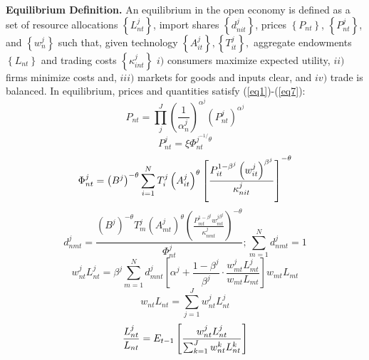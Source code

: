 \documentclass{article}
\begin{document}
\textbf{Equilibrium Definition. } An equilibrium in the open economy is
defined as a set of resource allocations $\left\{ L_{nt}^{j}\right\} $,
import shares $\left\{ d_{nit}^{j}\right\} $, prices $\left\{ P_{nt}\right\} 
$, $\left\{ P_{nt}^{j}\right\} $, and $\left\{ w_{n}^{j}\right\} $ such
that, given technology $\left\{ A_{it}^{j}\right\}
,\left\{T_{it}^{j}\right\} ,$ aggregate endowments $\left\{ L_{nt}\right\} $
and trading costs $\left\{ \kappa _{int}^{j}\right\} $ $i)$ consumers
maximize expected utility, $ii)$ firms minimize costs and, $iii)$ markets
for goods and inputs clear, and $iv)$ trade is balanced. In equilibrium,
prices and quantities satisfy (\ref{eq1})-(\ref{eq7}): 
\begin{equation}
P_{nt}=\prod_{j}^{J}\left( \frac{1}{\alpha _{n}^{j}}\right)
^{\alpha^{j}}\left( P_{nt}^{j}\right) ^{\alpha ^{j}}  \label{eq1}
\end{equation}
\begin{equation}
P_{nt}^{j}=\xi\Phi _{nt}^{j^{-1/}\theta }  \label{eq2}
\end{equation}
\begin{equation}
\Phi _{nt}^{j}=\left( B^{j}\right) ^{-\theta
}\sum_{i=1}^{N}T_{i}^{j}\left(A_{it}^{j}\right) ^{\theta }\left[ \frac{%
P_{it}^{1-\beta ^{j}}\left(w_{it}^{j}\right) ^{\beta ^{j}}}{\kappa _{nit}^{j}%
}\right] ^{-\theta }  \label{eq3}
\end{equation}
\begin{equation}
d_{nmt}^{j}=\frac{\left( B^{j}\right) ^{-\theta
}T_{m}^{j}\left(A_{mt}^{j}\right) ^{\theta }\left( \frac{P_{mt}^{1-\beta
^{j}}w_{mt}^{j\beta^{j}}}{\kappa _{nmt}^{j}}\right) ^{-\theta }}{\Phi
_{nt}^{j}};\sum\limits_{m=1}^{N}d_{nmt}^{j}=1  \label{eq4}
\end{equation}
\begin{equation}
w_{nt}^{j}L_{nt}^{j}=\beta^{j}\sum_{m=1}^{N}d_{mnt}^{j}\left[\alpha^{j}+%
\frac{1-\beta^{j}}{\beta^j} \cdot \frac{w_{mt}^{j}L_{mt}^{j}}{w_{mt}L_{mt}}%
\right] w_{mt}L_{mt}  \label{eq5}
\end{equation}
\begin{equation}
w_{nt}L_{nt}=\sum_{j=1}^{J}w_{nt}^{j}L_{nt}^{j}  \label{eq6}
\end{equation}
\begin{equation}
\frac{L_{nt}^{j}}{L_{nt}}=E_{t-1}\left[ \frac{w_{nt}^{j}L_{nt}^{j}}{%
\sum_{k=1}^J w_{nt}^{k}L_{nt}^{k}}\right]  \label{eq7}
\end{equation}
\end{document}
